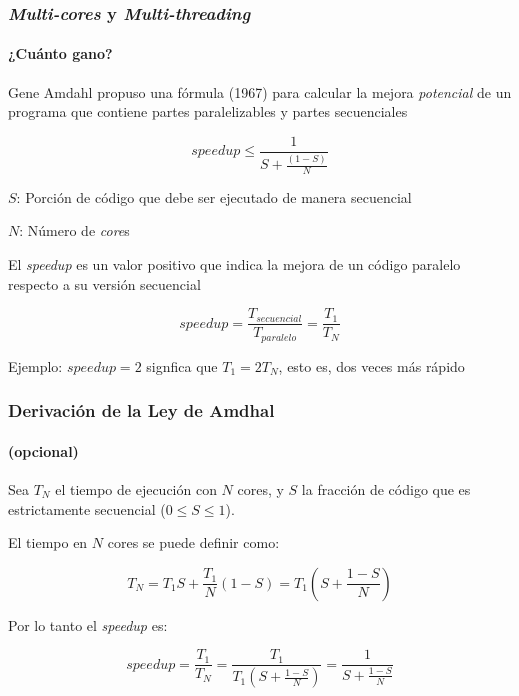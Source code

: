 \documentclass[letter]{beamer}
\begin{document}
\begin{frame}
  \frametitle{ {\em Multi-cores} y {\em Multi-threading}}
  \framesubtitle{¿Cuánto gano?}
  
  Gene Amdahl propuso una fórmula (1967) para calcular la mejora {\em potencial} de un programa
  que contiene partes paralelizables y partes secuenciales
  
  \begin{equation*}
    \mathit{speedup} \leq \frac{1}{S + \frac{(1-S)}{N}}
  \end{equation*}
  
  $S$: Porción de código que debe ser ejecutado de manera secuencial
  
  $N$: Número de {\em core}s
  
  El {\em speedup} es un valor positivo que indica la mejora de un código paralelo respecto a su versión secuencial
  
  \begin{equation*}
    \mathit{speedup} = \frac{T_{\mathit{secuencial}}}{T_{\mathit{paralelo}}} = \frac{T_{1}}{T_{N}}
  \end{equation*}
  
  Ejemplo: $\mathit{speedup}=2$ signfica que $T_{1}=2T_{N}$, esto es, dos veces más rápido
\end{frame}
\begin{frame}
  \frametitle{Derivación de la Ley de Amdhal}
  \framesubtitle{(opcional)}

  Sea $T_N$ el tiempo de ejecución con $N$ cores, y $S$ la fracción de código que es estrictamente secuencial
  ($0 \leq S \leq 1$).
  
  El tiempo en $N$ cores se puede definir como:
  
  \begin{equation*}
    T_N = T_1 S + \frac{T_1}{N} (1-S) = T_1 \left( S + \frac{1-S}{N} \right)
  \end{equation*}
  
  Por lo tanto el {\em speedup} es:
  
  \begin{equation*}
    \mathit{speedup} = \frac{T_1}{T_N} = \frac{T_1}{T_1 \left( S + \frac{1-S}{N} \right)} = \frac{1}{S + \frac{1-S}{N}}
  \end{equation*}
  

\end{frame}
\end{document}
